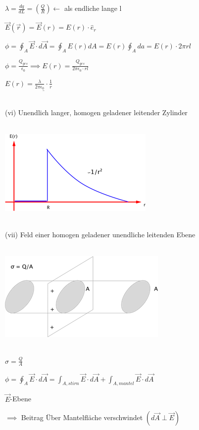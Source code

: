 \documentclass[11pt]{article}
\begin{document}
$ \lambda=\frac{dq}{dL}=(\frac{Q}{R})\leftarrow $ als endliche lange l

$ \vec{E}(\vec{r})=\vec{E}(r)=E(r)\cdot\hat{e}_r $

$ \phi=\oint_{A}\vec{E}\cdot d\vec{A}=\oint_{A}E(r)dA=E(r)\oint_{A}da= E(r)\cdot 2\pi r l $

$ \phi=\frac{Q_{ges}}{\epsilon_0}\implies E(r)= \frac{Q_{ges}}{2\pi\epsilon_0\cdot rl} $

$ E(r)= \underline{ \frac{\lambda}{2\pi\epsilon_0}\cdot\frac{1}{r}}$

\hfill\\

(vi) Unendlich langer, homogen geladener leitender Zylinder

\hfill\\

\includegraphics{skizzen/14/14_6B9}

\hfill\\

(vii) Feld einer homogen geladener unendliche leitenden Ebene

\hfill\\

\includegraphics{skizzen/14/14_6BA}

\hfill\\

$ \sigma=\frac{Q}{A} $

$ \displaystyle\phi = \oint_{A}\vec{E}\cdot d\vec{A}=\int_{A, stirn}^{} \vec{E}\cdot d\vec{A}+\int_{A, mantel}^{} \vec{E}\cdot d\vec{A}   $

$ \vec{E} $-Ebene

$ \implies $ Beitrag Über Mantelfläche verschwindet $ (d\vec{A}\perp\vec{E}) $
\end{document}
